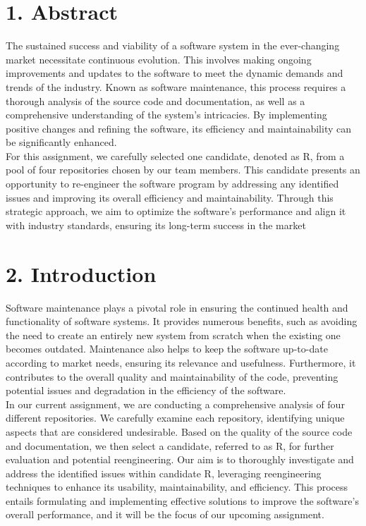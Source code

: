 \documentclass[letterpaper, 11pt]{report}
\begin{document}
\section*{1. Abstract}
\normalsize { The sustained success and viability of a software system in the ever-changing market necessitate continuous evolution. This involves making ongoing improvements and updates to the software to meet the dynamic demands and trends of the industry. Known as software maintenance, this process requires a thorough analysis of the source code and documentation, as well as a comprehensive understanding of the system's intricacies. By implementing positive changes and refining the software, its efficiency and maintainability can be significantly enhanced.\\

For this assignment, we carefully selected one candidate, denoted as R, from a pool of four repositories chosen by our team members. This candidate presents an opportunity to re-engineer the software program by addressing any identified issues and improving its overall efficiency and maintainability. Through this strategic approach, we aim to optimize the software's performance and align it with industry standards, ensuring its long-term success in the market
}

\section*{2. Introduction}
\normalsize {Software maintenance plays a pivotal role in ensuring the continued health and functionality of software systems. It provides numerous benefits, such as avoiding the need to create an entirely new system from scratch when the existing one becomes outdated. Maintenance also helps to keep the software up-to-date according to market needs, ensuring its relevance and usefulness. Furthermore, it contributes to the overall quality and maintainability of the code, preventing potential issues and degradation in the efficiency of the software.\\

In our current assignment, we are conducting a comprehensive analysis of four different repositories. We carefully examine each repository, identifying unique aspects that are considered undesirable. Based on the quality of the source code and documentation, we then select a candidate, referred to as R, for further evaluation and potential reengineering. Our aim is to thoroughly investigate and address the identified issues within candidate R, leveraging reengineering techniques to enhance its usability, maintainability, and efficiency. This process entails formulating and implementing effective solutions to improve the software's overall performance, and it will be the focus of our upcoming assignment.} 
\end{document}
